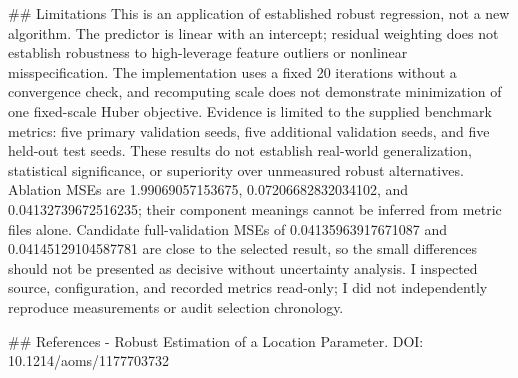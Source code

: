 \documentclass{article}
\begin{document}
\#\# Limitations
This is an application of established robust regression, not a new algorithm. The predictor is linear with an intercept; residual weighting does not establish robustness to high-leverage feature outliers or nonlinear misspecification. The implementation uses a fixed 20 iterations without a convergence check, and recomputing scale does not demonstrate minimization of one fixed-scale Huber objective. Evidence is limited to the supplied benchmark metrics: five primary validation seeds, five additional validation seeds, and five held-out test seeds. These results do not establish real-world generalization, statistical significance, or superiority over unmeasured robust alternatives. Ablation MSEs are 1.99069057153675, 0.07206682832034102, and 0.04132739672516235; their component meanings cannot be inferred from metric files alone. Candidate full-validation MSEs of 0.04135963917671087 and 0.04145129104587781 are close to the selected result, so the small differences should not be presented as decisive without uncertainty analysis. I inspected source, configuration, and recorded metrics read-only; I did not independently reproduce measurements or audit selection chronology.

\#\# References
- Robust Estimation of a Location Parameter. DOI: 10.1214/aoms/1177703732
\end{document}
